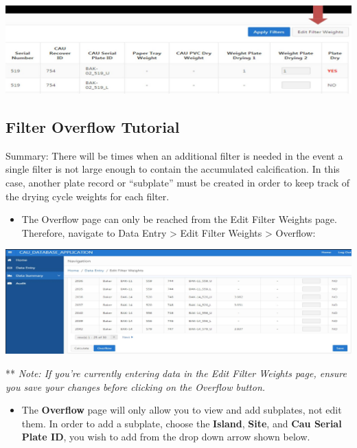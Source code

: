 \documentclass[]{book}
\providecommand{\tightlist}{%
  \setlength{\itemsep}{0pt}\setlength{\parskip}{0pt}}
\begin{document}
\includegraphics{images/Data15.jpg}

\hypertarget{filter-overflow-tutorial}{%
\subsection{Filter Overflow Tutorial}\label{filter-overflow-tutorial}}

Summary: There will be times when an additional filter is needed in the event a single filter is not large enough to contain the accumulated calcification. In this case, another plate record or ``subplate'' must be created in order to keep track of the drying cycle weights for each filter.

\begin{itemize}
\tightlist
\item
  The Overflow page can only be reached from the Edit Filter Weights page. Therefore, navigate to Data Entry \textgreater{} Edit Filter Weights \textgreater{} Overflow:
\end{itemize}

\includegraphics{images/Data16.jpg}

** \emph{Note: If you're currently entering data in the Edit Filter Weights page, ensure you save your changes before clicking on the Overflow button.}

\begin{itemize}
\tightlist
\item
  The \textbf{Overflow} page will only allow you to view and add subplates, not edit them. In order to add a subplate, choose the \textbf{Island}, \textbf{Site}, and \textbf{Cau Serial Plate ID}, you wish to add from the drop down arrow shown below.
\end{itemize}
\end{document}

